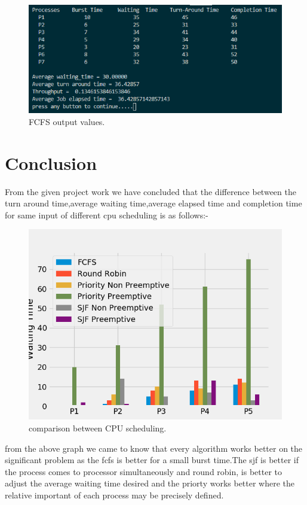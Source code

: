 \documentclass[11pt,a4paper]{report}
\begin{document}
\begin{figure}[H]

	\includegraphics[scale=0.9]{./img/rr_out.PNG}
	\caption{FCFS output values.}
\end{figure}


\chapter{Conclusion}
\vskip 1cm
\large{{From the given project work we have concluded that the difference between the turn around time,average waiting time,average elapsed time and completion time for same input of different cpu scheduling is as follows:-}
\vskip 1cm
\begin{figure}[H]
	\centering
	\includegraphics[scale=0.9]{./img/compare.png}
	\caption{comparison between CPU scheduling.}
\end{figure}
\vskip 1cm
\large{from the above graph we came to know that every algorithm works better on the significant problem as the fcfs is better for a small burst time.The sjf is better if the process comes to processor simultaneously and round robin, is better to adjust the average waiting time desired and the priorty works better  where the relative important of each process may be precisely defined.}
}
\vskip 15cm
\end{document}
